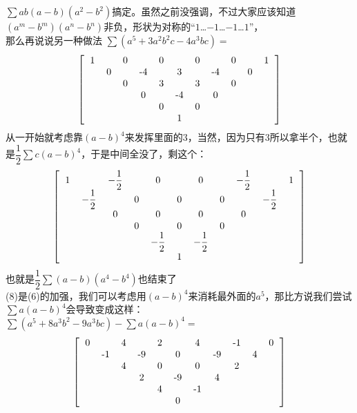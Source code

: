 \documentclass[UTF8]{ctexart}
\begin{document}
$ \displaystyle \sum ab(a-b)(a^{2}-b^{2}) $搞定。虽然之前没强调，不过大家应该知道$ (a^{m}-b^{m})(a^{n}-b^{n}) $非负，形状为对称的“$ 1 $…$ -1 $…$ -1 $…$ 1 $”，\\
那么再说说另一种做法
$ \displaystyle \sum (a^{5}+3a^{2}b^{2}c-4a^{3}bc)= $
  \renewcommand*{\arraystretch}{1.732}\[\left[\begin{matrix}
  	\begin{tabular}{ccccccccccccc}
  		1& &0& &0& &0& &0& &1\\
  		&0& &-4& &3& &-4& &0&\\
  		& &0& &3& &3& &0& &\\
  		& & &0& &-4& &0& & &\\
  		& & & &0& &0& & & &\\
  		& & & & &1& & & & &\\
  	\end{tabular}
  \end{matrix}\right]\]
从一开始就考虑靠$ (a-b)^{4} $来发挥里面的3，当然，因为只有3所以拿半个，也就是$ \dfrac{1}{2} \displaystyle \sum c(a-b)^{4} $，于是中间全没了，剩这个：
 \renewcommand*{\arraystretch}{1.732}\[\left[\begin{matrix}
	\begin{tabular}{ccccccccccccc}
		1& &$ -\dfrac{1}{2} $& &0& &0& &$ -\dfrac{1}{2} $& &1\\
		&$ -\dfrac{1}{2} $& &0& &0& &0& &$ -\dfrac{1}{2} $&\\
		& &0& &0& &0& &0& &\\
		& & &0& &0& &0& & &\\
		& & & &$ -\dfrac{1}{2} $& &$ -\dfrac{1}{2} $& & & &\\
		& & & & &1& & & & &\\
	\end{tabular}
  \end{matrix}\right]\]
也就是$ \displaystyle \dfrac{1}{2} \displaystyle \sum (a-b)(a^{4}-b^{4}) $也结束了\\
(8)是(6)的加强，我们可以考虑用$ (a-b)^{4} $来消耗最外面的$ a^5 $，那比方说我们尝试$ \displaystyle \sum a(a-b)^{4} $会导致变成这样：\\
$  \displaystyle \sum (a^{5}+8 a^{3} b^{2}-9a^{3}bc)-\displaystyle \sum a(a-b)^{4}=$
  \renewcommand*{\arraystretch}{1.732}\[\left[\begin{matrix}
  	\begin{tabular}{ccccccccccccc}
  		0& &4& &2& &4& &-1& &0\\
  		&-1& &-9& &0& &-9& &4&\\
  		& &4& &0& &0& &2& &\\
  		& & &2& &-9& &4& & &\\
  		& & & &4& &-1& & & &\\
  		& & & & &0& & & & &\\
  	\end{tabular}
  \end{matrix}\right]\]
\end{document}
